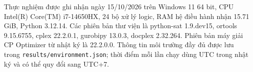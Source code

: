 Thực nghiệm được ghi nhận ngày 15/10/2026 trên Windows 11 64 bit, CPU Intel(R) Core(TM) i7-14650HX, 24 bộ xử lý logic, RAM hệ điều hành nhận 15.71 GiB, Python 3.12.14. Các phiên bản thư viện là python-sat 1.9.dev15, ortools 9.15.6755, cplex 22.2.0.1, gurobipy 13.0.3, docplex 2.32.264. Phiên bản máy giải CP Optimizer từ nhật ký là 22.2.0.0. Thông tin môi trường đầy đủ được lưu trong \texttt{results/environment.json}; thời điểm mỗi lần chạy dùng UTC trong nhật ký và có thể quy đổi sang UTC+7.
